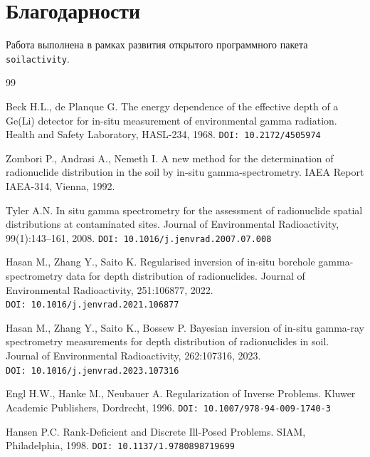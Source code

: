 \documentclass[12pt,a4paper]{article}
\begin{document}
\section*{Благодарности}

Работа выполнена в рамках развития открытого программного
пакета \texttt{soilactivity}.


\newpage
\begin{thebibliography}{99}

Beck H.L., de Planque G.
The energy dependence of the effective depth of a Ge(Li) detector
for in-situ measurement of environmental gamma radiation.
Health and Safety Laboratory, HASL-234, 1968.
\texttt{DOI:~10.2172/4505974}

Zombori P., Andrasi A., Nemeth I.
A new method for the determination of radionuclide distribution
in the soil by in-situ gamma-spectrometry.
IAEA Report IAEA-314, Vienna, 1992.

Tyler A.N.
In situ gamma spectrometry for the assessment of radionuclide
spatial distributions at contaminated sites.
Journal of Environmental Radioactivity, 99(1):143--161, 2008.
\texttt{DOI:~10.1016/j.jenvrad.2007.07.008}

Hasan M., Zhang Y., Saito K.
Regularised inversion of in-situ borehole gamma-spectrometry data
for depth distribution of radionuclides.
Journal of Environmental Radioactivity, 251:106877, 2022.
\texttt{DOI:~10.1016/j.jenvrad.2021.106877}

Hasan M., Zhang Y., Saito K., Bossew P.
Bayesian inversion of in-situ gamma-ray spectrometry measurements
for depth distribution of radionuclides in soil.
Journal of Environmental Radioactivity, 262:107316, 2023.
\texttt{DOI:~10.1016/j.jenvrad.2023.107316}

Engl H.W., Hanke M., Neubauer A.
Regularization of Inverse Problems.
Kluwer Academic Publishers, Dordrecht, 1996.
\texttt{DOI:~10.1007/978-94-009-1740-3}

Hansen P.C.
Rank-Deficient and Discrete Ill-Posed Problems.
SIAM, Philadelphia, 1998.
\texttt{DOI:~10.1137/1.9780898719699}


\end{thebibliography}
\end{document}

